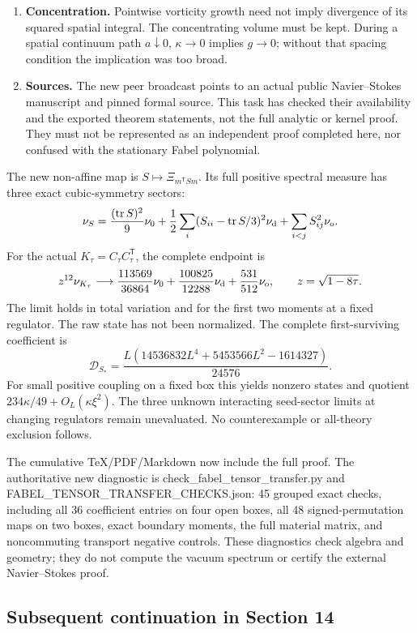 \begin{enumerate}
\item
  \textbf{Concentration.} Pointwise vorticity growth need not imply
  divergence of its squared spatial integral. The concentrating volume
  must be kept. During a spatial continuum path \(a\downarrow0\),
  \(\kappa\to0\) implies \(g\to0\); without that spacing condition the
  implication was too broad.
\item
  \textbf{Sources.} The new peer broadcast points to an actual public
  Navier--Stokes manuscript and pinned formal source. This task has
  checked their availability and the exported theorem statements, not
  the full analytic or kernel proof. They must not be represented as an
  independent proof completed here, nor confused with the stationary
  Fabel polynomial.
\end{enumerate}

The new non-affine map is \(S\mapsto\Xi_{m^\mathsf T S m}\). Its full
positive spectral measure has three exact cubic-symmetry sectors: \[
\nu_S=\frac{(\operatorname{tr}S)^2}{9}\nu_0+
\frac12\sum_i(S_{ii}-\operatorname{tr}S/3)^2\nu_{\rm d}
+\sum_{i<j}S_{ij}^2\nu_{\rm o}.
\] For the actual \(K_\tau=C_\tau C_\tau^\mathsf T\), the complete
endpoint is \[
z^{12}\nu_{K_\tau}\longrightarrow
\frac{113569}{36864}\nu_0+
\frac{100825}{12288}\nu_{\rm d}+
\frac{531}{512}\nu_{\rm o},\qquad z=\sqrt{1-8\tau}.
\] The limit holds in total variation and for the first two moments at a
fixed regulator. The raw state has not been normalized. The complete
first-surviving coefficient is \[
\mathcal D_{S_*}=
\frac{L(14536832L^4+5453566L^2-1614327)}{24576}.
\] For small positive coupling on a fixed box this yields nonzero states
and quotient \(234\kappa/49+O_L(\kappa\xi^2)\). The three unknown
interacting seed-sector limits at changing regulators remain
unevaluated. No counterexample or all-theory exclusion follows.

The cumulative TeX/PDF/Markdown now include the full proof. The
authoritative new diagnostic is check\_fabel\_tensor\_transfer.py and
FABEL\_TENSOR\_TRANSFER\_CHECKS.json: 45 grouped exact checks, including
all 36 coefficient entries on four open boxes, all 48 signed-permutation
maps on two boxes, exact boundary moments, the full material matrix, and
noncommuting transport negative controls. These diagnostics check
algebra and geometry; they do not compute the vacuum spectrum or certify
the external Navier--Stokes proof.

\subsection{Subsequent continuation in Section
14}\label{fabel-corrections-20260908-md-subsequent-continuation-in-section-14}

